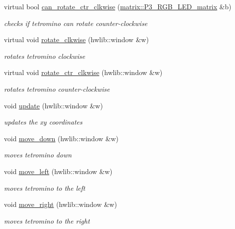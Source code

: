 \begin{DoxyCompactItemize}
virtual bool \hyperlink{classtetris_1_1Tetromino_a0c0646597824b901b9b22a5b1b9d6436}{can\+\_\+rotate\+\_\+ctr\+\_\+clkwise} (\hyperlink{classmatrix_1_1P3__RGB__LED__matrix}{matrix\+::\+P3\+\_\+\+R\+G\+B\+\_\+\+L\+E\+D\+\_\+matrix} \&b)
\begin{DoxyCompactList}\small\item\em checks if tetromino can rotate counter-\/clockwise \end{DoxyCompactList}\item 
virtual void \hyperlink{classtetris_1_1Tetromino_a18a7c7e9f0caa52f425d99a818a1e2d2}{rotate\+\_\+clkwise} (hwlib\+::window \&w)
\begin{DoxyCompactList}\small\item\em rotates tetromino clockwise \end{DoxyCompactList}\item 
virtual void \hyperlink{classtetris_1_1Tetromino_a948dca1ff8a7e128270cdbbba8d214a3}{rotate\+\_\+ctr\+\_\+clkwise} (hwlib\+::window \&w)
\begin{DoxyCompactList}\small\item\em rotates tetromino counter-\/clockwise \end{DoxyCompactList}\item 
void \hyperlink{classtetris_1_1Tetromino_a2e9fa7445d505ea6125bd692cd7f0aa2}{update} (hwlib\+::window \&w)
\begin{DoxyCompactList}\small\item\em updates the xy coordinates \end{DoxyCompactList}\item 
void \hyperlink{classtetris_1_1Tetromino_a581b04b1c750ab0e2ebca62aba4611f7}{move\+\_\+down} (hwlib\+::window \&w)
\begin{DoxyCompactList}\small\item\em moves tetromino down \end{DoxyCompactList}\item 
void \hyperlink{classtetris_1_1Tetromino_adf8a1d7bc8d3e3897ea4d155e96a34f5}{move\+\_\+left} (hwlib\+::window \&w)
\begin{DoxyCompactList}\small\item\em moves tetromino to the left \end{DoxyCompactList}\item 
void \hyperlink{classtetris_1_1Tetromino_ae2a139a5e4e31424a8db98b19b534db8}{move\+\_\+right} (hwlib\+::window \&w)
\begin{DoxyCompactList}\small\item\em moves tetromino to the right \end{DoxyCompactList}\item 

\end{DoxyCompactItemize}
